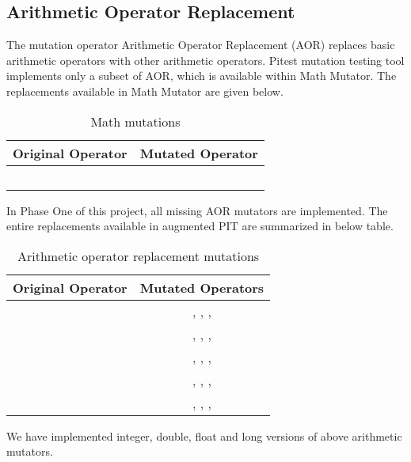 \subsection{Arithmetic Operator Replacement}
The mutation operator Arithmetic Operator Replacement (AOR) replaces basic arithmetic operators with other arithmetic operators. Pitest mutation testing tool implements only a subset of AOR, which is available within Math Mutator. The replacements available in Math Mutator are given below.\newline


\begin{table}
  \centering
  \begin{tabular}{c c}
    \toprule
    Original Operator & Mutated Operator \\
    \midrule
    \java{+}          & \java{-}         \\
    \java{-}          & \java{+}         \\
    \java{*}          & \java{/}         \\
    \java{/}          & \java{*}         \\
    \java{\%}         & \java{*}         \\
    \bottomrule
  \end{tabular}
  \caption[Math mutations]{Math mutations}
  \label{tab:aor:src_ops}
\end{table}

In Phase One of this project, all missing AOR mutators are implemented. The entire replacements available in augmented PIT are summarized in below table.\\

\begin{table}
  \centering
  \begin{tabular}{c c}
    \toprule
    Original Operator & Mutated Operators                                           \\
    \midrule
    \java{+}          & \phantom{\java{+},} \java{-}, \java{*}, \java{/}, \java{\%} \\
    \java{-}          & \java{+}, \phantom{\java{-},} \java{*}, \java{/}, \java{\%} \\
    \java{*}          & \java{+}, \java{-}, \phantom{\java{*},} \java{/}, \java{\%} \\
    \java{/}          & \java{+}, \java{-}, \java{*}, \phantom{\java{/},} \java{\%} \\
    \java{\%}         & \java{+}, \java{-}, \java{*}, \java{/}\phantom{, \java{\%}} \\
    \bottomrule
  \end{tabular}
  \caption[AOR mutations]{Arithmetic operator replacement mutations}
  \label{tab:aor:src_ops}
\end{table}

We have implemented integer, double, float and long versions of above arithmetic mutators.

